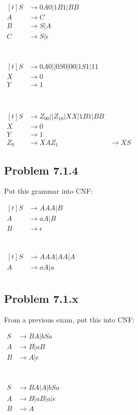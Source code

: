 \documentclass[12pt]{scrbook}
\begin{document}
$ \begin{aligned}[t]
  S &\rightarrow 0A0| 1B1| BB \\
  A &\rightarrow C \\
  B &\rightarrow S | A \\
  C &\rightarrow S | \epsilon
\end{aligned}$
\\\\\\
$ \begin{aligned}[t]
  S &\rightarrow 0A0| | 0S0 | 00 |  1S1| 11 \\
  X &\rightarrow 0 \\
  Y &\rightarrow 1 \\
\end{aligned}$
\\\\\\
$ \begin{aligned}[t]
  S &\rightarrow Z_00| | Z_10 | XX |  1B1| BB \\
  X &\rightarrow 0 \\
  Y &\rightarrow 1 \\
  Z_0 &\rightarrow XA
  Z_1 &\rightarrow XS
\end{aligned}$


\subsection*{Problem 7.1.4}Put this grammar into CNF:

$\begin{aligned}[t]
  S &\rightarrow AAA | B \\
  A &\rightarrow aA | B \\
  B &\rightarrow \epsilon
\end{aligned}$
\\\\\\
$\begin{aligned}[t]
  S &\rightarrow AAA | AA | A \\
  A &\rightarrow aA | a \\
\end{aligned}$


\subsection*{Problem 7.1.x}From a previous exam, put this into CNF:

$\begin{aligned}
 S &\rightarrow BA | bSa \\
 A &\rightarrow B | aB \\
 B &\rightarrow A | \epsilon
\end{aligned}$
\\\\\\
$\begin{aligned}
 S &\rightarrow BA | A | bSa \\
 A &\rightarrow B | aB | a | \epsilon \\
 B &\rightarrow A
\end{aligned}$
\end{document}
